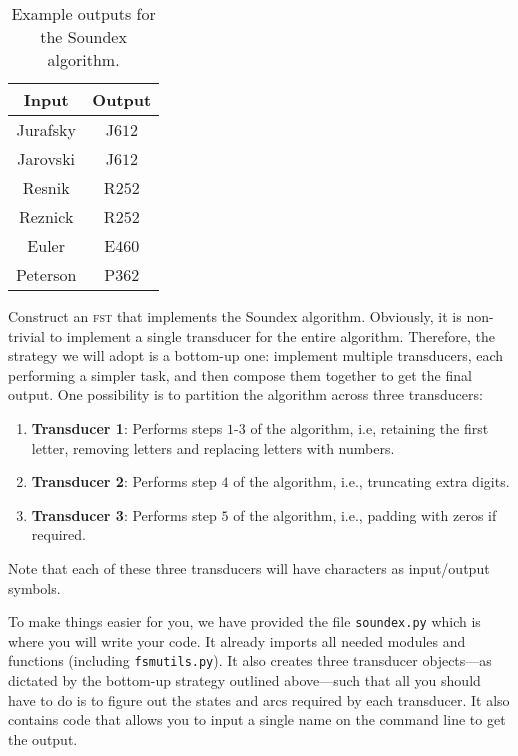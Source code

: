\documentclass[11pt]{article}
\begin{document}
\begin{table}[htbp]
	\begin{center}
		\begin{tabular}{|c|c|}
			\hline
			\textbf{Input} & \textbf{Output} \\ \hline \hline
			Jurafsky & J$612$ \\ \hline
			Jarovski & J$612$ \\ \hline
			Resnik & R$252$ \\ \hline
			Reznick & R$252$ \\ \hline
			Euler & E$460$ \\ \hline
			Peterson & P$362$ \\ \hline
			\end{tabular}
		\caption{Example outputs for the Soundex algorithm.}\label{tbl:soundex}
\end{center}
\end{table}

 Construct an \textsc{fst} that implements the Soundex
 algorithm. Obviously, it is non-trivial to implement a single
 transducer for the entire algorithm. Therefore, the strategy we will
 adopt is a bottom-up one: implement multiple transducers, each
 performing a simpler task, and then compose them together to get the
 final output. One possibility is to partition the algorithm across
 three transducers:
\begin{enumerate}
	\item \textbf{Transducer 1}: Performs steps $1$-$3$ of the
          algorithm, i.e, retaining the first letter, removing letters
          and replacing letters with numbers.
	\item \textbf{Transducer 2}: Performs step $4$ of the
          algorithm, i.e., truncating extra digits.
	\item \textbf{Transducer 3}: Performs step $5$ of the
          algorithm, i.e., padding with zeros if required. 
\end{enumerate}
 Note that each of these three transducers will have characters as
 input/output symbols.  

 To make things easier for you, we have provided the file
 \texttt{soundex.py} which is where you will write your code. It
 already imports all needed modules and functions (including
 \texttt{fsmutils.py}). It also creates three transducer objects---as
 dictated by the bottom-up strategy outlined above---such that all you
 should have to do is to figure out the states and arcs required by
 each transducer. It also contains code that allows you to input a
 single name on the command line to get the output.
\end{document}
